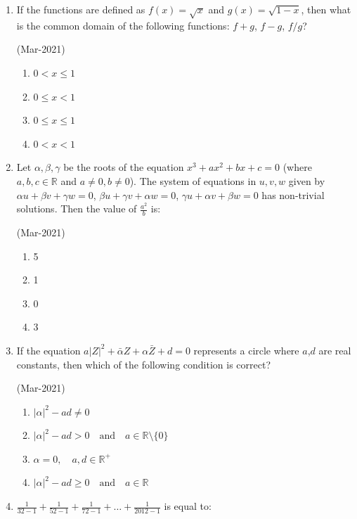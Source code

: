\documentclass[journal,12pt,onecolumn]{IEEEtran}
\theoremstyle{remark}
\begin{document}
\begin{enumerate}
	\item
		If the functions are defined as $f(x)=\sqrt{x}$ and $g(x)=\sqrt{1-x}$, then what is the common domain of the following functions: $f+g$, $f-g$, $f/g$?

		\hfill{(Mar-2021)}
		\begin{enumerate}
    \item $0 < x \leq 1$
    \item $0 \leq x < 1$
    \item $0 \leq x \leq 1$
    \item $0 < x < 1$
                \end{enumerate}
	\item
		Let $\alpha, \beta, \gamma$ be the roots of the equation $x^3 + ax^2 + bx + c = 0$ (where $a, b, c \in \mathbb{R}$ and $a \neq 0, b \neq 0$). The system of equations in $u, v, w$ given by $\alpha u + \beta v + \gamma w = 0$, $\beta u + \gamma v + \alpha w = 0$, $\gamma u + \alpha v + \beta w = 0$ has non-trivial solutions. Then the value of $\frac{a^2}{b}$ is:

			\hfill{(Mar-2021)}

               \begin{enumerate}
    \item 5
    \item 1
    \item 0
    \item 3
               \end{enumerate}
       \item
	       If the equation $a{|Z|}^2 + \bar{\alpha}Z + \alpha \bar{Z} + d = 0$ represents a circle where $a$,$d$ are real constants, then which of the following condition is correct?

			\hfill{(Mar-2021)}
		\begin{enumerate}
    \item $|\alpha|^2 - ad \neq 0$
    \item $|\alpha|^2 - ad > 0 \quad \text{and} \quad a \in \mathbb{R} \setminus \{0\}$
    \item $\alpha = 0, \quad a, d \in \mathbb{R}^+$
    \item $|\alpha|^2 - ad \geq 0 \quad \text{and} \quad a \in \mathbb{R}$
                \end{enumerate}
	\item
		$ \frac{1}{32 - 1} + \frac{1}{52 - 1} + \frac{1}{72 - 1} + \ldots + \frac{1}{2012 - 1} $ is equal to:


\end{enumerate}
\end{document}
